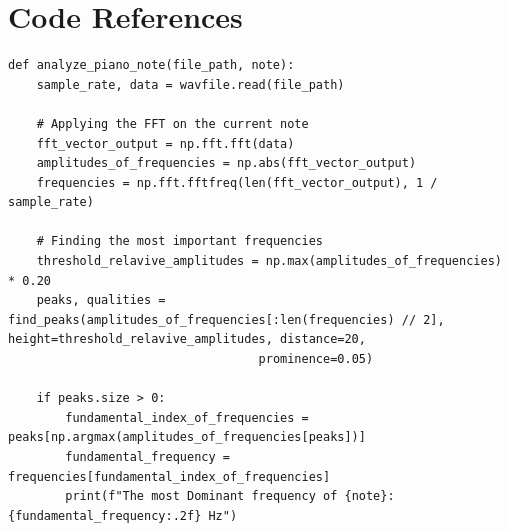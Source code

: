 \documentclass{article}
\begin{document}
\section* {Code References}
\begin{verbatim}
def analyze_piano_note(file_path, note):
    sample_rate, data = wavfile.read(file_path)

    # Applying the FFT on the current note
    fft_vector_output = np.fft.fft(data)
    amplitudes_of_frequencies = np.abs(fft_vector_output)
    frequencies = np.fft.fftfreq(len(fft_vector_output), 1 / sample_rate)

    # Finding the most important frequencies
    threshold_relavive_amplitudes = np.max(amplitudes_of_frequencies) * 0.20
    peaks, qualities = find_peaks(amplitudes_of_frequencies[:len(frequencies) // 2], height=threshold_relavive_amplitudes, distance=20,
                                   prominence=0.05)

    if peaks.size > 0:
        fundamental_index_of_frequencies = peaks[np.argmax(amplitudes_of_frequencies[peaks])]
        fundamental_frequency = frequencies[fundamental_index_of_frequencies]
        print(f"The most Dominant frequency of {note}: {fundamental_frequency:.2f} Hz")

\end{verbatim}
\end{document}
